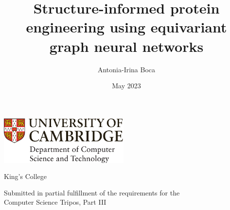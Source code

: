 \documentclass[12pt,a4paper]{report}
\title{Structure-informed protein engineering using equivariant graph neural networks}
\author{Antonia-Irina Boca}
\date{May 2023}
\newif\ifsubmission %
\newcommand{\candidatenumber}{2485A}
\newcommand{\college}{King's College}
\newcommand{\course}{Computer Science Tripos, Part III}
\begin{document}

\begin{sffamily} %

\begin{titlepage}
\makeatletter

\hspace*{-14mm}\includegraphics[width=65mm]{logo-dcst-colour}

\ifsubmission

\begin{Large}
\vspace{20mm}
Research project report title page

\vspace{35mm}
Candidate \candidatenumber

\vspace{42mm}
\textsl{``\@title''}

\end{Large}

\else

\begin{center}
\Huge
\vspace{\fill}

\@title
\vspace{\fill}

\@author
\vspace{10mm}

\Large
\college
\vspace{\fill}

\@date
\vspace{\fill}

\end{center}

\fi

\vspace{\fill}
\begin{center}
Submitted in partial fulfillment of the requirements for the\\
\course
\end{center}

\makeatother
\end{titlepage}


\end{sffamily}
\end{document}
